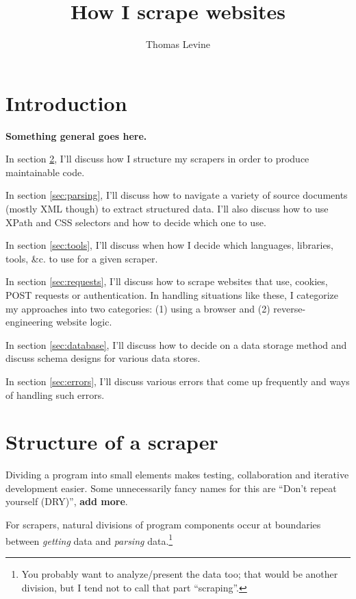 \documentclass{article}
\title{How I scrape websites}
\author{Thomas Levine}
\newcommand\todo[1]{\textbf{#1}}
\begin{document}
\maketitle
{}
\section{Introduction}
\todo{Something general goes here.}

In section \ref{sec:structure}, I'll discuss how I structure my
scrapers in order to produce maintainable code.

In section \ref{sec:parsing}, I'll discuss how to navigate a variety
of source documents (mostly XML though) to extract structured
data. I'll also discuss how to use XPath and CSS selectors and how
to decide which one to use.

In section \ref{sec:tools}, I'll discuss when how I decide which
languages, libraries, tools, \&c. to use for a given scraper.

In section \ref{sec:requests}, I'll discuss how to scrape websites
that use, cookies, POST requests or authentication. In handling
situations like these, I categorize my approaches into two categories:
(1) using a browser and (2) reverse-engineering website logic.

In section \ref{sec:database}, I'll discuss how to decide on a data
storage method and discuss schema designs for various data stores.

In section \ref{sec:errors}, I'll discuss various errors that come
up frequently and ways of handling such errors.

\section{Structure of a scraper}\label{sec:structure}
Dividing a program into small elements makes testing, collaboration
and iterative development easier. Some unnecessarily fancy names for
this are ``Don't repeat yourself (DRY)'', \todo{add more}.

For scrapers, natural divisions of program components occur at boundaries
between \emph{getting} data and \emph{parsing} data.\footnote{
You probably want to analyze/present the data too; that would be
another division, but I tend not to call that part ``scraping''.}
\end{document}
